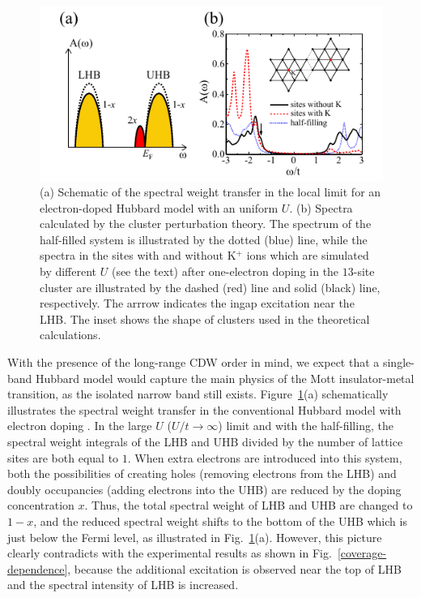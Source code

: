 \documentclass[aps,prl,reprint,groupedaddress,showpacs,amsfonts,amsmath,amssymb,superscriptaddress]{revtex4-1}
\begin{document}
\begin{figure}
  \centering
  \includegraphics[scale=1.0]{fig/fig4.pdf}
  \caption{\label{theoritical-spectra}(a) Schematic of the spectral weight transfer in the local limit for an electron-doped Hubbard model with an uniform $U$. (b) Spectra calculated by the cluster perturbation theory. The spectrum of the half-filled system is illustrated by the dotted (blue) line, while the spectra in the sites with and without K$^{+}$ ions which are simulated by different $U$ (see the text) after one-electron doping in the $13$-site cluster are illustrated by the dashed (red) line and solid (black) line, respectively. The arrrow indicates the ingap excitation near the LHB. The inset shows the shape of clusters used in the theoretical calculations.}
\end{figure}
With the presence of the long-range CDW order in mind, we expect that a single-band Hubbard model would capture the main physics of the Mott insulator-metal transition, as the isolated narrow band still exists. Figure~\ref{theoritical-spectra}(a) schematically illustrates the spectral weight transfer in the conventional Hubbard model with electron doping \cite{PhysRevLett.67.1035,PhysRevB.90.245102}. In the large $U$ ($U/t\rightarrow\infty$) limit and with the half-filling, the spectral weight integrals of the LHB and UHB divided by the number of lattice sites are both equal to $1$. When extra electrons are introduced into this system, both the possibilities of creating holes (removing electrons from the LHB) and doubly occupancies (adding electrons into the UHB) are reduced by the doping concentration $x$. Thus, the total spectral weight of LHB and UHB are changed to $1-x$, and the reduced spectral weight shifts to the bottom of the UHB which is just below the Fermi level, as illustrated in Fig.~\ref{theoritical-spectra}(a). However, this picture clearly contradicts with the experimental results as shown in Fig.~\ref{coverage-dependence}, because the additional excitation is observed near the top of LHB and the spectral intensity of LHB is increased.
\end{document}
